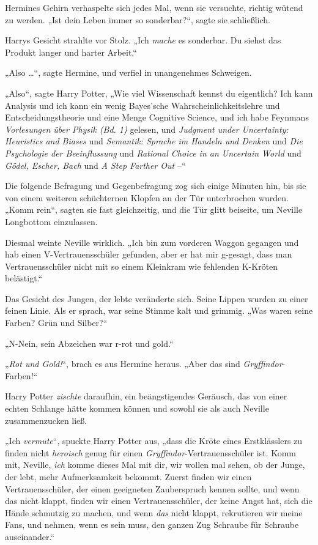 {Hermines Gehirn verhaspelte sich jedes Mal, wenn sie versuchte, richtig wütend zu werden. „Ist dein Leben immer so sonderbar?“, sagte sie schließlich.

Harrys Gesicht strahlte vor Stolz. „Ich \emph{mache} es sonderbar. Du siehst das Produkt langer und harter Arbeit.“

„Also …“, sagte Hermine, und verfiel in unangenehmes Schweigen.

„Also“, sagte Harry Potter, „Wie viel Wissenschaft kennst du eigentlich? Ich kann Analysis und ich kann ein wenig Bayes'sche Wahrscheinlichkeitslehre und Entscheidungstheorie und eine Menge Cognitive Science, und ich habe Feynmans \emph{Vorlesungen über Physik (Bd. 1)} gelesen, und \emph{Judgment under Uncertainty: Heuristics and Biases} und \emph{Semantik: Sprache im Handeln und Denken} und \emph{Die Psychologie der Beeinflussung} und \emph{Rational Choice in an Uncertain World} und \emph{Gödel, Escher, Bach} und \emph{A Step Farther Out} --“

Die folgende Befragung und Gegenbefragung zog sich einige Minuten hin, bis sie von einem weiteren schüchternen Klopfen an der Tür unterbrochen wurden. „Komm rein“, sagten sie fast gleichzeitig, und die Tür glitt beiseite, um Neville Longbottom einzulassen.

Diesmal weinte Neville wirklich. „Ich bin zum vorderen Waggon gegangen und hab einen V-Vertrauensschüler gefunden, aber er hat mir g-gesagt, dass man Vertrauensschüler nicht mit so einem Kleinkram wie fehlenden K-Kröten belästigt.“

Das Gesicht des Jungen, der lebte veränderte sich. Seine Lippen wurden zu einer feinen Linie. Als er sprach, war seine Stimme kalt und grimmig. „Was waren seine Farben? Grün und Silber?“

„N-Nein, sein Abzeichen war r-rot und gold.“

„\emph{Rot und Gold!}“, brach es aus Hermine heraus. „Aber das sind \emph{Gryffindor}-Farben!“

Harry Potter \emph{zischte} daraufhin, ein beängstigendes Geräusch, das von einer echten Schlange hätte kommen können und sowohl sie als auch Neville zusammenzucken ließ.

„Ich \emph{vermute}“, spuckte Harry Potter aus, „dass die Kröte eines Erstklässlers zu finden nicht \emph{heroisch} genug für einen \emph{Gryffindor}-Vertrauensschüler ist. Komm mit, Neville, \emph{ich} komme dieses Mal mit dir, wir wollen mal sehen, ob der Junge, der lebt, mehr Aufmerksamkeit bekommt. Zuerst finden wir einen Vertrauensschüler, der einen geeigneten Zauberspruch kennen sollte, und wenn das nicht klappt, finden wir einen Vertrauensschüler, der keine Angst hat, sich die Hände schmutzig zu machen, und wenn \emph{das} nicht klappt, rekrutieren wir meine Fans, und nehmen, wenn es sein muss, den ganzen Zug Schraube für Schraube auseinander.“

}
